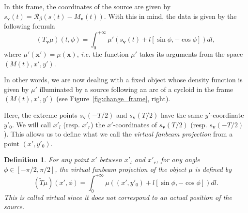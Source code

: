 \documentclass[a4paper]{article}
\numberwithin{equation}{section}
\newcommand{\ie}{\emph{i.e.} }
\newcommand{\bx}{\mathbf{x}}
\newcommand{\bv}{\mathbf{v}}
\newcommand{\Mbv}{M_{\mathbf{v}}}
\newcommand{\Tbv}{T_{\mathbf{v}}}
\newcommand{\sbv}{s_{\mathbf{v}}}
\newtheorem{definition}{Definition}
\begin{document}
In this frame, the coordinates of the source are given by $\sbv(t)=\mathcal{R}_{\beta} \left( s(t)-\Mbv(t) \right)$. With this in mind, the data is given by the following formula
\begin{equation}
	(\Tbv\mu)(t,\phi) = \int_0^{+\infty} \mu' \left( s_{\bv}(t) + l \left[ \sin \phi, -\cos \phi \right] \right) dl,
\end{equation}
where $\mu'(\bx')=\mu(\bx)$, \ie the function $\mu'$ takes its arguments from the space $\left(M(t), x', y'\right)$.

In other words, we are now dealing with a fixed object whose density function is given by $\mu'$ illuminated by a source following an arc of a cycloid in the frame $\left(M(t), x', y'\right)$ (see Figure~\ref{fig:change_frame}, right).

Here, the extreme points $\sbv(-T/2)$ and $\sbv(T/2)$ have the same $y'$-coordinate $y'_0$. We will call $x'_l$ (resp. $x'_r$) the $x'$-coordinates of $\sbv(T/2)$ (resp. $\sbv(-T/2)$). This allows us to define what we call the \emph{virtual fanbeam projection} from a point $(x',y'_0)$.
\begin{definition}
	For any point $x'$ between $x'_l$ and $x'_r$, for any angle $\phi \in \left[ -\pi/2, \pi/2\right]$, the \emph{virtual fanbeam projection} of the object $\mu$ is defined by
\begin{equation}
	\left( \tilde{T}\mu	\right)(x',\phi) = \int_0^{+\infty} \mu \left( (x',y'_0) + l \left[ \sin \phi, -\cos \phi \right] \right) dl.
\end{equation}
This is called \emph{virtual} since it does not correspond to an actual position of the source.
\end{definition}
\end{document}
